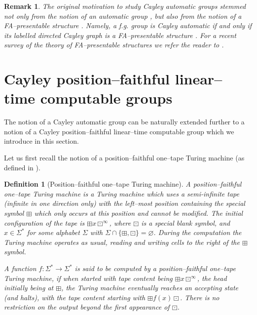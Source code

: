 \documentclass[article,12pt]{elsarticle}
\newtheorem{remark}{Remark}
\newtheorem{definition}{Definition}
\begin{document}
\begin{remark} 
	The original motivation 
	to study Cayley automatic groups 
	stemmed not only from the notion of 
	an automatic group \cite{Epsteinbook}, but also
	from the notion of a FA--presentable
	structure \cite{KhoussainovNerode95}. 
	Namely, a f.g. group is Cayley automatic if and 
	only if its labelled directed Cayley graph 
	is a FA--presentable structure \cite{KKM11}. 
	For a recent survey of the theory of
	FA--presentable structures we refer the
	reader to \cite{Stephan2015}.           
\end{remark}	



\section{Cayley position--faithful linear--time computable 
groups}
\label{quasi-Cayley-automatic-section} 

The notion of a Cayley automatic group 
can be naturally extended further to 
a notion of a 
Cayley position--faithful linear--time computable 
group which we introduce in this section.


  
Let us first recall the notion 
of a position--faithful 
one--tape Turing machine (as defined in \cite[p.~4]{Stephan_lmcs_13}). \begin{definition}[Position--faithful one--tape Turing machine]\label{defn:posFaith}
A position--faithful one--tape Turing machine is a Turing machine which uses a 
semi-infinite tape (infinite in one direction only)
with the left--most position containing the special symbol $\boxplus$ which only occurs at this position and cannot be modified. 
The initial configuration of the tape is $\boxplus x \boxdot^\infty$, where $\boxdot$ is a special blank symbol, and $x\in \Sigma^*$ for some alphabet $\Sigma$ with $\Sigma\cap\{\boxplus ,\boxdot\}=\varnothing$. During the computation the Turing machine operates as usual, reading and writing cells to the right of the $\boxplus$ symbol.


A function $f : \Sigma^* \rightarrow \Sigma^*$ is said to be
computed by a position--faithful one--tape Turing machine, if when started with tape content being 
$\boxplus x \boxdot^\infty$, the head initially being at 
$\boxplus$, the Turing machine eventually reaches an accepting state (and halts), with the tape content starting with 
$\boxplus f(x) \boxdot$. There is no restriction on the output beyond the first appearance of $\boxdot$.  \end{definition}
\end{document}
